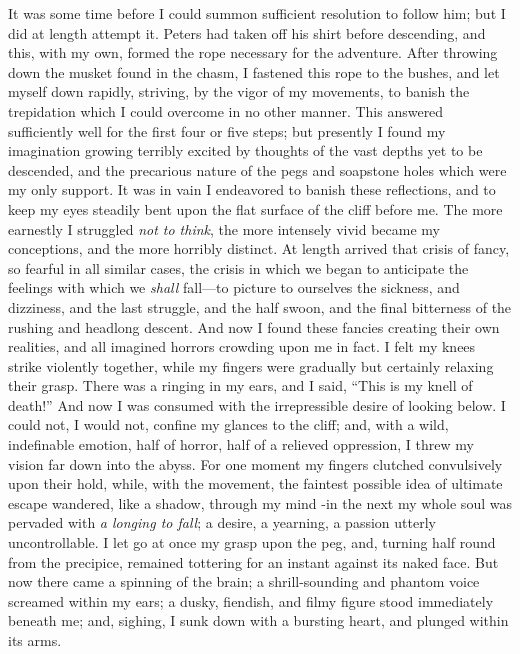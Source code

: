It was some time before I could summon sufficient resolution to follow him;
but I did at length attempt it. Peters had taken off his shirt before
descending, and this, with my own, formed the rope necessary for the adventure.
After throwing down the musket found in the chasm, I fastened this rope to the
bushes, and let myself down rapidly, striving, by the vigor of my movements, to
banish the trepidation which I could overcome in no other manner. This answered
sufficiently well for the first four or five steps; but presently I found my
imagination growing terribly excited by thoughts of the vast depths yet to be
descended, and the precarious nature of the pegs and soapstone holes which were
my only support. It was in vain I endeavored to banish these reflections, and to
keep my eyes steadily bent upon the flat surface of the cliff before me. The
more earnestly I struggled \emph{not to think}, the more intensely vivid became
my conceptions, and the more horribly distinct. At length arrived that crisis of
fancy, so fearful in all similar cases, the crisis in which we began to
anticipate the feelings with which we \emph{shall} fall---to picture to
ourselves the sickness, and dizziness, and the last struggle, and the half
swoon, and the final bitterness of the rushing and headlong descent. And now I
found these fancies creating their own realities, and all imagined horrors
crowding upon me in fact. I felt my knees strike violently together, while my
fingers were gradually but certainly relaxing their grasp. There was a ringing
in my ears, and I said, ``This is my knell of death!'' And now I was consumed with
the irrepressible desire of looking below. I could not, I would not, confine my
glances to the cliff; and, with a wild, indefinable emotion, half of horror,
half of a relieved oppression, I threw my vision far down into the abyss. For
one moment my fingers clutched convulsively upon their hold, while, with the
movement, the faintest possible idea of ultimate escape wandered, like a shadow,
through my mind -in the next my whole soul was pervaded with \emph{a longing to
fall}; a desire, a yearning, a passion utterly uncontrollable. I let go at
once my grasp upon the peg, and, turning half round from the precipice, remained
tottering for an instant against its naked face. But now there came a spinning
of the brain; a shrill-sounding and phantom voice screamed within my ears; a
dusky, fiendish, and filmy figure stood immediately beneath me; and, sighing, I
sunk down with a bursting heart, and plunged within its arms. 

